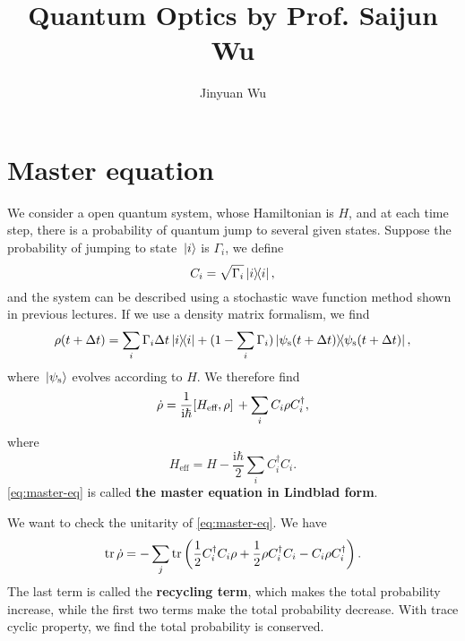 \documentclass[hyperref, a4paper]{article}
\title{Quantum Optics by Prof. Saijun Wu}
\author{Jinyuan Wu}
\newcommand*{\ii}{\mathrm{i}}
\newcommand*{\concept}[1]{{\textbf{#1}}}
\begin{document}
\maketitle

\section{Master equation}

We consider a open quantum system, whose Hamiltonian is $H$, and at each time step, there is a probability 
of quantum jump to several given states. Suppose the probability of jumping to state $\ket*{i}$ is $\Gamma_i$,
we define 
\begin{equation}
    C_i = \sqrt{\Gamma_i} \dyad{i},
\end{equation} 
and the system can be described using a stochastic wave function method shown in previous lectures.
If we use a density matrix formalism, we find 
\[
    \rho(t + \Delta t) = \sum_i \Gamma_i \Delta t \dyad{i} + (1 - \sum_i \Gamma_i) \dyad{\psi_\text{s}(t + \Delta t)},
\]
where $\ket*{\psi_\text{s}}$ evolves according to $H$. We therefore find 
\begin{equation}
    \dot{\rho} = \frac{1}{\ii \hbar} \comm*{H_\text{eff}}{\rho} + \sum_i C_i \rho C_i^\dagger,
    \label{eq:master-eq}
\end{equation}
where 
\begin{equation}
    H_\text{eff} = H - \frac{\ii \hbar}{2} \sum_i C_i^\dagger C_i.
\end{equation}
\eqref{eq:master-eq} is called \concept{the master equation in Lindblad form}.

We want to check the unitarity of \eqref{eq:master-eq}. We have 
\begin{equation}
    \trace \dot{\rho} = - \sum_j \trace \left( \frac{1}{2} C_i^\dagger C_i \rho + \frac{1}{2} \rho C_i^\dagger C_i - C_i \rho C_i^\dagger \right).
\end{equation}
The last term is called the \concept{recycling term}, which makes the total probability increase, while the first 
two terms make the total probability decrease. With trace cyclic property, we find the total probability 
is conserved.
\end{document}
